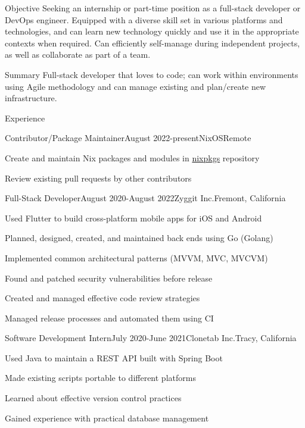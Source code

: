 \documentclass{resume}
\begin{document}
\begin{rSection}{Objective}
  Seeking an internship or part-time position as a full-stack developer or DevOps engineer. Equipped with
  a diverse skill set in various platforms and technologies, and can learn new technology quickly and use it
  in the appropriate contexts when required. Can efficiently self-manage during independent projects, as
  well as collaborate as part of a team.
\end{rSection}

\begin{rSection}{Summary}
  Full-stack developer that loves to code; can work within environments using Agile methodology and can
  manage existing and plan/create new infrastructure.
\end{rSection}

\begin{rSection}{Experience}
  \begin{rSubsection}{Contributor/Package Maintainer}{August 2022-present}{NixOS}{Remote}
    \item{Create and maintain Nix packages and modules in \href{https://github.com/NixOS/nixpkgs}{nixpkgs} repository}
    \item{Review existing pull requests by other contributors}
  \end{rSubsection}
  \begin{rSubsection}{Full-Stack Developer}{August 2020-August 2022}{Zyggit Inc.}{Fremont, California}
    \item{Used Flutter to build cross-platform mobile apps for iOS and Android}
    \item{Planned, designed, created, and maintained back ends using Go (Golang)}
    \item{Implemented common architectural patterns (MVVM, MVC, MVCVM)}
    \item{Found and patched security vulnerabilities before release}
    \item{Created and managed effective code review strategies}
    \item{Managed release processes and automated them using CI}
  \end{rSubsection}
  \begin{rSubsection}{Software Development Intern}{July 2020-June 2021}{Clonetab Inc.}{Tracy, California}
    \item{Used Java to maintain a REST API built with Spring Boot}
    \item{Made existing scripts portable to different platforms}
    \item{Learned about effective version control practices}
    \item{Gained experience with practical database management}
  \end{rSubsection}
\end{rSection}
\end{document}
